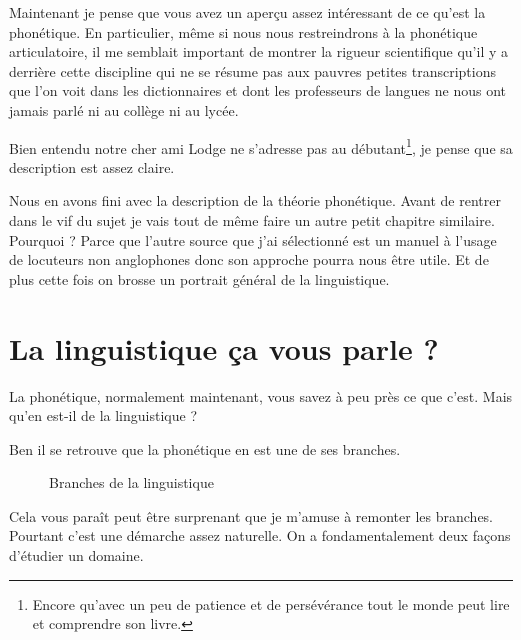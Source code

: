 Maintenant je pense que vous avez un aperçu assez intéressant de ce
qu'est la phonétique. En particulier, même si nous nous restreindrons
à la phonétique articulatoire, il me semblait important de montrer la
rigueur scientifique qu'il y a derrière cette discipline qui ne se
résume pas aux pauvres petites transcriptions que l'on voit dans les
dictionnaires et dont les professeurs de langues ne nous ont jamais
parlé ni au collège ni au lycée.

Bien entendu notre cher ami Lodge ne s'adresse pas au
débutant\footnote{Encore qu'avec un peu de patience et de persévérance
tout le monde peut lire et comprendre son livre.}, je pense que sa
description est assez claire.

Nous en avons fini avec la description de la théorie phonétique. Avant
de rentrer dans le vif du sujet je vais tout de même faire un autre
petit chapitre similaire. Pourquoi ? Parce que l'autre source que j'ai
sélectionné est un manuel à l'usage de locuteurs non anglophones donc
son approche pourra nous être utile. Et de plus cette fois on brosse
un portrait général de la linguistique.

\newpage
\minitoc
\newpage

\chapter{La linguistique ça vous parle ?}\label{chap:linguistic}

La phonétique, normalement maintenant, vous savez à peu près ce que
c'est. Mais qu'en est-il de la linguistique ?

Ben il se retrouve que la phonétique en est une de ses branches.

\begin{center}
    \begin{figure}[h]
      \centering
    \caption{Branches de la linguistique}
    \label{fig:branch-phon}
  \end{figure}
\end{center}
Cela vous paraît peut être surprenant que je m'amuse à remonter les
branches. Pourtant c'est une démarche assez naturelle. On a
fondamentalement deux façons d'étudier un domaine.


